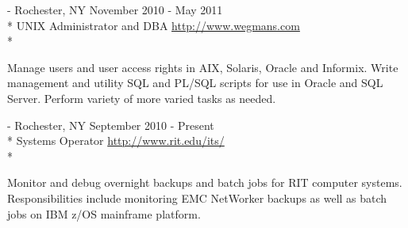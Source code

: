 \documentclass[letter,margin,line]{resume}
\newcommand{\rurl}[1]{\hfill {\footnotesize \url{#1}}}
\newcommand{\rdate}[1]{\hfill {\small #1}}
\renewcommand{\employer}[5]{\item[#1] - #2 \rdate{#3} \\* #4 \rurl{#5} \\*}
\begin{document}
\begin{resume}
\begin{asparadesc}
        \employer{Wegmans Food Markets}{Rochester, NY}{November 2010 - May 2011}{UNIX Administrator and DBA}{http://www.wegmans.com}

        \small
        Manage users and user access rights in AIX, Solaris, Oracle and
        Informix. Write management and utility SQL and PL/SQL scripts for use in Oracle and
        SQL Server.  Perform variety of more varied tasks as needed.
		\normalsize
		\\
		
		\employer{RIT Information \& Technology Services}{Rochester, NY}{September 2010 - Present}{Systems Operator}{http://www.rit.edu/its/}

		\small
		Monitor and debug overnight backups and batch jobs for RIT
		computer systems. Responsibilities include monitoring EMC NetWorker backups as well as batch jobs on IBM z/OS mainframe platform.
		\normalsize
		\\
	\end{asparadesc}


\end{resume}
\end{document}
